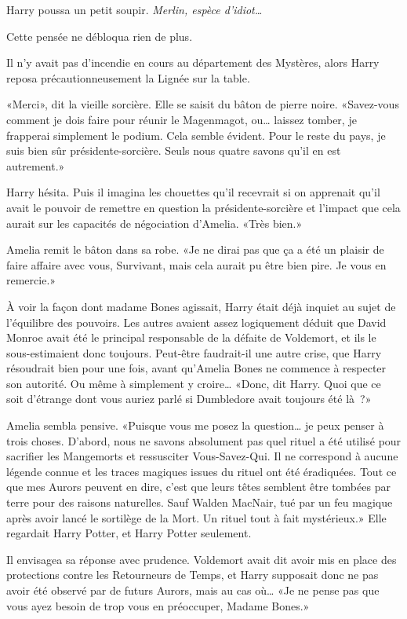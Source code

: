 Harry poussa un petit soupir. \emph{Merlin, espèce d'idiot…}

Cette pensée ne débloqua rien de plus.

Il n'y avait pas d'incendie en cours au département des Mystères, alors Harry reposa précautionneusement la Lignée sur la table.

«Merci», dit la vieille sorcière. Elle se saisit du bâton de pierre noire. «Savez-vous comment je dois faire pour réunir le Magenmagot, ou… laissez tomber, je frapperai simplement le podium. Cela semble évident. Pour le reste du pays, je suis bien sûr présidente-sorcière. Seuls nous quatre savons qu'il en est autrement.»

Harry hésita. Puis il imagina les chouettes qu'il recevrait si on apprenait qu'il avait le pouvoir de remettre en question la présidente-sorcière et l'impact que cela aurait sur les capacités de négociation d'Amelia. «Très bien.»

Amelia remit le bâton dans sa robe. «Je ne dirai pas que ça a été un plaisir de faire affaire avec vous, Survivant, mais cela aurait pu être bien pire. Je vous en remercie.»

À voir la façon dont madame Bones agissait, Harry était déjà inquiet au sujet de l'équilibre des pouvoirs. Les autres avaient assez logiquement déduit que David Monroe avait été le principal responsable de la défaite de Voldemort, et ils le sous-estimaient donc toujours. Peut-être faudrait-il une autre crise, que Harry résoudrait bien pour une fois, avant qu'Amelia Bones ne commence à respecter son autorité. Ou même à simplement y croire… «Donc, dit Harry. Quoi que ce soit d'étrange dont vous auriez parlé si Dumbledore avait toujours été là~?»

Amelia sembla pensive. «Puisque vous me posez la question… je peux penser à trois choses. D'abord, nous ne savons absolument pas quel rituel a été utilisé pour sacrifier les Mangemorts et ressusciter Vous-Savez-Qui. Il ne correspond à aucune légende connue et les traces magiques issues du rituel ont été éradiquées. Tout ce que mes Aurors peuvent en dire, c'est que leurs têtes semblent être tombées par terre pour des raisons naturelles. Sauf Walden MacNair, tué par un feu magique après avoir lancé le sortilège de la Mort. Un rituel tout à fait mystérieux.» Elle regardait Harry Potter, et Harry Potter seulement.

Il envisagea sa réponse avec prudence. Voldemort avait dit avoir mis en place des protections contre les Retourneurs de Temps, et Harry supposait donc ne pas avoir été observé par de futurs Aurors, mais au cas où… «Je ne pense pas que vous ayez besoin de trop vous en préoccuper, Madame Bones.»

